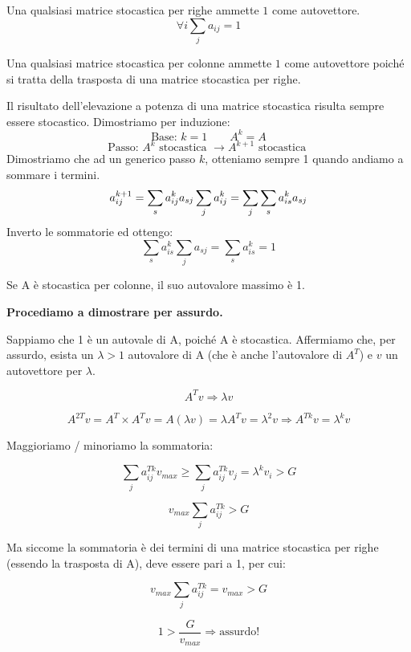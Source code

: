 \documentclass[\main/main.tex]{subfiles}
\begin{document}
\begin{definition}
Una qualsiasi matrice stocastica per righe ammette $1$ come autovettore.
\[
	\forall i \sum_j a_{ij} = 1
\]
\end{definition}

\begin{definition}
Una qualsiasi matrice stocastica per colonne ammette $1$ come autovettore poiché si tratta della trasposta di una matrice stocastica per righe.
\end{definition}

\begin{theorem}
Il risultato dell'elevazione a potenza di una matrice stocastica risulta sempre essere stocastico. Dimostriamo per induzione:
\[
	\text{Base: } k=1 \qquad A^k = A
\] 
\[
	\text{Passo: } A^k \text{ stocastica } \rightarrow A^{k+1} \text{ stocastica }
\]
Dimostriamo che ad un generico passo $k$, otteniamo sempre 1 quando andiamo a sommare i termini.
\[
	a_{ij}^{k+1} = \sum_s a^k_{ij} a_{sj}\\
	\sum_j a^k_{ij} = \sum_j \sum_s a^k_{is}a_{sj}
\] 
Inverto le sommatorie ed ottengo:
\[
	\sum_s a_{is}^k \sum_j a_{sj} = \sum_s a^k_{is} = 1
\]
\end{theorem}

\begin{theorem}
Se A è stocastica per colonne, il suo autovalore massimo è 1.

\textbf{Procediamo a dimostrare per assurdo.}

Sappiamo che 1 è un autovale di A, poiché A è stocastica. Affermiamo che, per assurdo, esista un $\lambda > 1$ autovalore di A (che è anche l'autovalore di $A^T$) e $v$ un autovettore per $\lambda$.

\[
	A^Tv \Rightarrow \lambda v
\]

\[
	A^{2T} v = A^T \times A^T v = A (\lambda v) = \lambda A^T v = \lambda ^2 v \Rightarrow A^{Tk} v = \lambda ^ k v
\]

Maggioriamo / minoriamo la sommatoria:

\[
	\sum_j a^{Tk}_{ij} v_{max} \geq \sum_j a_{ij}^{Tk} v_j = \lambda ^ k v_i > G
\]

\[
	v_{max} \sum_j a_{ij}^{Tk} > G
\]

Ma siccome la sommatoria è dei termini di una matrice stocastica per righe (essendo la trasposta di A), deve essere pari a 1, per cui:

\[
	v_{max} \sum_j a_{ij}^{Tk} = v_{max} > G
\]

\[
	1 > \dfrac{G}{v_{max}} \Rightarrow \text{assurdo!}
\]

\end{theorem}
\end{document}
